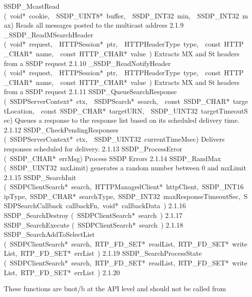 \documentclass{article}
\begin{document}
\begin{cxxentry}
\begin{cxxentry}
\begin{cxxnames}
        {SSDP\_McastRead}
        {(\ void*\ cookie,\ \ SSDP\_UINT8*\ buffer,\ \ SSDP\_INT32\ min,\ \ SSDP\_INT32\ max)}
        {Reads all messages posted to the multicast address}
        {2.1.9}
        {\_SSDP\_ReadMSearchHeader}
        {(\ void*\ request,\ \ HTTPSession*\ ptr,\ \ HTTPHeaderType\ type,\ \ const\ HTTP\_CHAR*\ name,\ \ const\ HTTP\_CHAR*\ value\ )}
        {Extracts MX and St headers from a SSDP request}
        {2.1.10}
        {\_SSDP\_ReadNotifyHeader}
        {(\ void*\ request,\ \ HTTPSession*\ ptr,\ \ HTTPHeaderType\ type,\ \ const\ HTTP\_CHAR*\ name,\ \ const\ HTTP\_CHAR*\ value\ )}
        {Extracts MX and St headers from a SSDP request}
        {2.1.11}
        {SSDP\_QueueSearchResponse}
        {(\ SSDPServerContext*\ ctx,\ \ SSDPSearch*\ search,\ \ const\ SSDP\_CHAR*\ targetLocation,\ \ const\ SSDP\_CHAR*\ targetURN,\ \ SSDP\_UINT32\ targetTimeoutSec)}
        {Queues a response to the response list based on its scheduled delivery time.}
        {2.1.12}
        {SSDP\_CheckPendingResponses}
        {(\ SSDPServerContext*\ ctx,\ \ SSDP\_UINT32\ currentTimeMsec)}
        {Delivers responses scheduled for delivery. }
        {2.1.13}
        {SSDP\_ProcessError}
        {(\ SSDP\_CHAR*\ errMsg)}
        {Process SSDP Errors}
        {2.1.14}
        {SSDP\_RandMax}
        {(\ SSDP\_UINT32\ mxLimit)}
        {generates a random number between 0 and mxLimit}
        {2.1.15}
        {SSDP\_SearchInit}
        {(\ SSDPClientSearch*\ search,\ HTTPManagedClient*\ httpClient,\ SSDP\_INT16\ ipType,\ SSDP\_CHAR*\ searchType,\ SSDP\_INT32\ maxResponseTimeoutSec,\ SSDPSearchCallback\ callbackFn,\ void*\ callbackData\ )}
        {}
        {2.1.16}
        {SSDP\_SearchDestroy}
        {(\ SSDPClientSearch*\ search\ )}
        {}
        {2.1.17}
        {SSDP\_SearchExecute}
        {(\ SSDPClientSearch*\ search\ )}
        {}
        {2.1.18}
        {SSDP\_SearchAddToSelectList}
        {(\ SSDPClientSearch*\ search,\ RTP\_FD\_SET*\ readList,\ RTP\_FD\_SET*\ writeList,\ RTP\_FD\_SET*\ errList\ )}
        {}
        {2.1.19}
        {SSDP\_SearchProcessState}
        {(\ SSDPClientSearch*\ search,\ RTP\_FD\_SET*\ readList,\ RTP\_FD\_SET*\ writeList,\ RTP\_FD\_SET*\ errList\ )}
        {}
        {2.1.20}
\end{cxxnames}
\begin{cxxdoc}
These functions are \<b\>not\</b\> at the API level and should not be called from

\end{cxxdoc}
\end{cxxentry}
\end{cxxentry}
\end{document}
